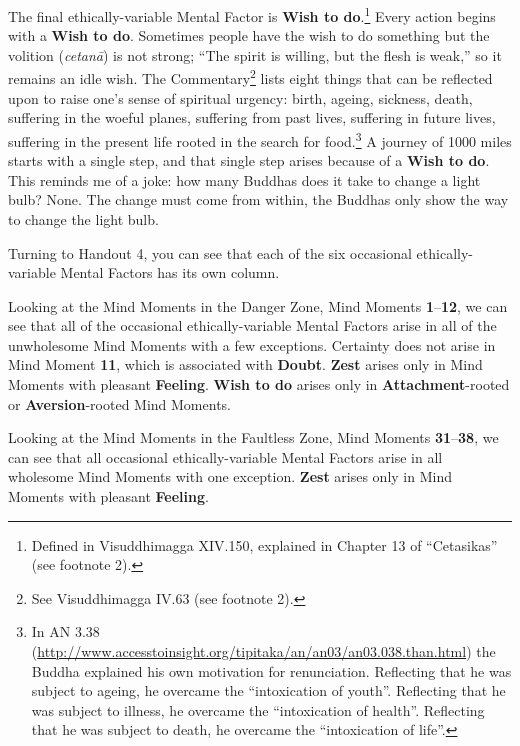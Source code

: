 The final ethically-variable Mental Factor is \textbf{Wish to do}.\footnote{Defined in Visuddhimagga XIV.150, explained in Chapter 13 of “Cetasikas” (see footnote 2).} Every action begins with a \textbf{Wish to do}. Sometimes people have the wish to do something but the volition (\textit{cetanā}) is not strong; “The spirit is willing, but the flesh is weak,” so it remains an idle wish. The Commentary\footnote{See Visuddhimagga IV.63 (see footnote 2).} lists eight things that can be reflected upon to raise one’s sense of spiritual urgency: birth, ageing, sickness, death, suffering in the woeful planes, suffering from past lives, suffering in future lives, suffering in the present life rooted in the search for food.\footnote{In AN 3.38 (\url{http://www.accesstoinsight.org/tipitaka/an/an03/an03.038.than.html}) the Buddha explained his own motivation for renunciation. Reflecting that he was subject to ageing, he overcame the “intoxication of youth”. Reflecting that he was subject to illness, he overcame the “intoxication of health”. Reflecting that he was subject to death, he overcame the “intoxication of life”.} A journey of 1000 miles starts with a single step, and that single step arises because of a \textbf{Wish to do}. This reminds me of a joke: how many Buddhas does it take to change a light bulb? None. The change must come from within, the Buddhas only show the way to change the light bulb.

Turning to Handout 4, you can see that each of the six occasional ethically-variable Mental Factors has its own column.

Looking at the Mind Moments in the Danger Zone, Mind Moments \textbf{1}--\textbf{12}, we can see that all of the occasional ethically-variable Mental Factors arise in all of the unwholesome Mind Moments with a few exceptions. Certainty does not arise in Mind Moment \textbf{11}, which is associated with \textbf{Doubt}. \textbf{Zest} arises only in Mind Moments with pleasant \textbf{Feeling}. \textbf{Wish to do} arises only in \textbf{Attachment}-rooted or \textbf{Aversion}-rooted Mind Moments.

Looking at the Mind Moments in the Faultless Zone, Mind Moments \textbf{31}--\textbf{38}, we can see that all occasional ethically-variable Mental Factors arise in all wholesome Mind Moments with one exception. \textbf{Zest} arises only in Mind Moments with pleasant \textbf{Feeling}.


